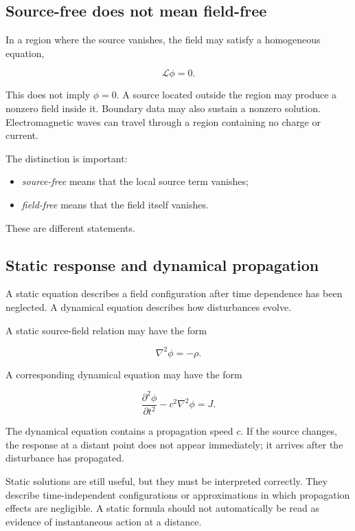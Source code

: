 \subsection{Source-free does not mean field-free}

In a region where the source vanishes, the field may satisfy a homogeneous equation,

\[
\mathcal{L}\phi=0.
\]

This does not imply \(\phi=0\). A source located outside the region may produce a nonzero field inside it. Boundary data may also sustain a nonzero solution. Electromagnetic waves can travel through a region containing no charge or current.

The distinction is important:

\begin{itemize}
    \item \emph{source-free} means that the local source term vanishes;
    \item \emph{field-free} means that the field itself vanishes.
\end{itemize}

These are different statements.

\subsection{Static response and dynamical propagation}

A static equation describes a field configuration after time dependence has been neglected. A dynamical equation describes how disturbances evolve.

A static source-field relation may have the form

\[
\nabla^{2}\phi=-\rho.
\]

A corresponding dynamical equation may have the form

\[
\frac{\partial^{2}\phi}{\partial t^{2}}
-c^{2}\nabla^{2}\phi
=J.
\]

The dynamical equation contains a propagation speed \(c\). If the source changes, the response at a distant point does not appear immediately; it arrives after the disturbance has propagated.

Static solutions are still useful, but they must be interpreted correctly. They describe time-independent configurations or approximations in which propagation effects are negligible. A static formula should not automatically be read as evidence of instantaneous action at a distance.

